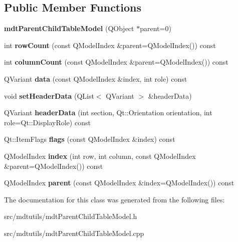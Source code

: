 \subsection*{Public Member Functions}
\begin{DoxyCompactItemize}
\item 
\hypertarget{classmdt_parent_child_table_model_a6a02b85f8663bd913b23380381287c0b}{
{\bfseries mdtParentChildTableModel} (QObject $\ast$parent=0)}
\label{classmdt_parent_child_table_model_a6a02b85f8663bd913b23380381287c0b}

\item 
\hypertarget{classmdt_parent_child_table_model_a00ede0aa95a181c04aafffa56bd8f470}{
int {\bfseries rowCount} (const QModelIndex \&parent=QModelIndex()) const }
\label{classmdt_parent_child_table_model_a00ede0aa95a181c04aafffa56bd8f470}

\item 
\hypertarget{classmdt_parent_child_table_model_a6d1941603fde6be4942439f22616249e}{
int {\bfseries columnCount} (const QModelIndex \&parent=QModelIndex()) const }
\label{classmdt_parent_child_table_model_a6d1941603fde6be4942439f22616249e}

\item 
\hypertarget{classmdt_parent_child_table_model_aea9349919cafde88c33aa6ff8c68f4ff}{
QVariant {\bfseries data} (const QModelIndex \&index, int role) const }
\label{classmdt_parent_child_table_model_aea9349919cafde88c33aa6ff8c68f4ff}

\item 
\hypertarget{classmdt_parent_child_table_model_a639b9f817d3c67e913c1e758ceb15f12}{
void {\bfseries setHeaderData} (QList$<$ QVariant $>$ \&headerData)}
\label{classmdt_parent_child_table_model_a639b9f817d3c67e913c1e758ceb15f12}

\item 
\hypertarget{classmdt_parent_child_table_model_ac0fe230365b4685729886eb89c3bee2d}{
QVariant {\bfseries headerData} (int section, Qt::Orientation orientation, int role=Qt::DisplayRole) const }
\label{classmdt_parent_child_table_model_ac0fe230365b4685729886eb89c3bee2d}

\item 
\hypertarget{classmdt_parent_child_table_model_ad937c815fb4d3afdd7bf6a222e216b2c}{
Qt::ItemFlags {\bfseries flags} (const QModelIndex \&index) const }
\label{classmdt_parent_child_table_model_ad937c815fb4d3afdd7bf6a222e216b2c}

\item 
\hypertarget{classmdt_parent_child_table_model_abd2bd46910ca92c7b92ff24593bfa4d1}{
QModelIndex {\bfseries index} (int row, int column, const QModelIndex \&parent=QModelIndex()) const }
\label{classmdt_parent_child_table_model_abd2bd46910ca92c7b92ff24593bfa4d1}

\item 
\hypertarget{classmdt_parent_child_table_model_aa4827005e9009f1b0fddf4ae962d6031}{
QModelIndex {\bfseries parent} (const QModelIndex \&index=QModelIndex()) const }
\label{classmdt_parent_child_table_model_aa4827005e9009f1b0fddf4ae962d6031}

\end{DoxyCompactItemize}


The documentation for this class was generated from the following files:\begin{DoxyCompactItemize}
\item 
src/mdtutils/mdtParentChildTableModel.h\item 
src/mdtutils/mdtParentChildTableModel.cpp\end{DoxyCompactItemize}
